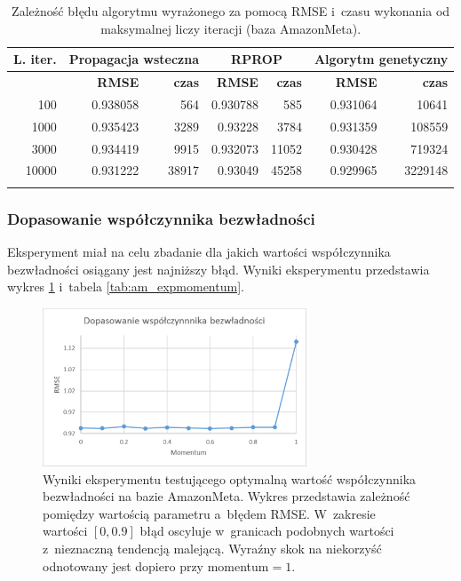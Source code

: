 \documentclass[twoside]{iisthesis}
\begin{document}
			\begin{longtable}[!ht]{r||rr|rr|rr}		
				\label{tab:am_expiterations}		
				\textbf{L. iter.} & \multicolumn{2}{c|}{\textbf{Propagacja wsteczna}}  & \multicolumn{2}{c|}{\textbf{RPROP}} & \multicolumn{2}{c}{\textbf{Algorytm genetyczny}}  \\
				\hline
				& \textbf{RMSE} & \textbf{czas} & \textbf{RMSE} & \textbf{czas} & \textbf{RMSE} & \textbf{czas} \\
				\hline
				100   & 0.938058 & 564   & 0.930788 & 585   & 0.931064 & 10641   \\
				1000  & 0.935423 & 3289  & 0.93228  & 3784  & 0.931359 & 108559  \\
				3000  & 0.934419 & 9915  & 0.932073 & 11052 & 0.930428 & 719324  \\
				10000 & 0.931222 & 38917 & 0.93049  & 45258 & 0.929965 & 3229148 \\
				\caption{Zależność błędu algorytmu wyrażonego za pomocą RMSE i~czasu wykonania od maksymalnej liczy iteracji (baza AmazonMeta).}
			\end{longtable}
			
			\subsubsection{Dopasowanie współczynnika bezwładności} 
			
			Eksperyment miał na celu zbadanie dla jakich wartości współczynnika bezwładności osiągany jest najniższy błąd. Wyniki eksperymentu przedstawia wykres \ref{fig:am_expmomentum} i~tabela \ref{tab:am_expmomentum}. 
			
			\begin{figure}[!ht]
				\centering
				\includegraphics[width=0.7\textwidth]{am_expmomentum}			
				\caption{Wyniki eksperymentu testującego optymalną wartość współczynnika bezwładności na bazie AmazonMeta. Wykres przedstawia zależność pomiędzy wartością parametru a~błędem RMSE. W~zakresie wartości $[0,0.9]$ błąd oscyluje w~granicach podobnych wartości z~nieznaczną tendencją malejącą. Wyraźny skok na niekorzyść odnotowany jest dopiero przy momentum$=1$.}
				\label{fig:am_expmomentum}
			\end{figure}
			
\end{document}
